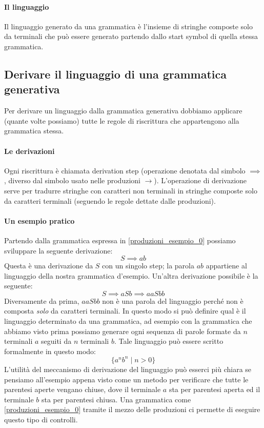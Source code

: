 \documentclass[class=book, crop=false, oneside, 12pt]{standalone}
\begin{document}
\paragraph{Il linguaggio}
Il linguaggio generato da una grammatica è l’insieme di stringhe composte solo da terminali che può essere generato partendo dallo start symbol di quella stessa grammatica.

\subsection{Derivare il linguaggio di una grammatica generativa}
Per derivare un linguaggio dalla grammatica generativa dobbiamo applicare (quante volte possiamo) tutte le regole di riscrittura che appartengono alla grammatica stessa. 

\paragraph{Le derivazioni}
Ogni riscrittura è chiamata derivation step (operazione denotata dal simbolo \(\implies\), diverso dal simbolo usato nelle produzioni \(\to\)). L’operazione di derivazione serve per tradurre stringhe con caratteri non terminali in stringhe composte solo da caratteri terminali (seguendo le regole dettate dalle produzioni).

\paragraph{Un esempio pratico}
Partendo dalla grammatica espressa in \ref{produzioni_esempio_0} possiamo sviluppare la seguente derivazione:
\begin{equation}
    S \implies ab
\end{equation}
Questa è una derivazione da \(S\) con un singolo step; la parola \(ab\) appartiene al linguaggio della nostra grammatica d’esempio.
Un'altra derivazione possibile è la seguente:
\begin{equation}
    S \implies aSb \implies aaSbb
\end{equation}
Diversamente da prima, \(aaSbb\) non è una parola del linguaggio perché non è composta \emph{solo} da caratteri terminali. In questo modo si può definire qual è il linguaggio determinato da una grammatica, ad esempio con la grammatica che abbiamo visto prima possiamo generare ogni sequenza di parole formate da \(n\) terminali \(a\) seguiti da \(n\) terminali \(b\).
Tale linguaggio può essere scritto formalmente in questo modo:
\begin{equation}
    \{a^n b^n \mid n>0\}
\end{equation}
L'utilità del meccanismo di derivazione del linguaggio può esserci più chiara se pensiamo all'esempio appena visto come un metodo per verificare che tutte le parentesi aperte vengano chiuse, dove il terminale \(a\) sta per parentesi aperta ed il terminale \(b\) sta per parentesi chiusa. Una grammatica come \ref{produzioni_esempio_0} tramite il mezzo delle produzioni ci permette di eseguire questo tipo di controlli.
\end{document}
